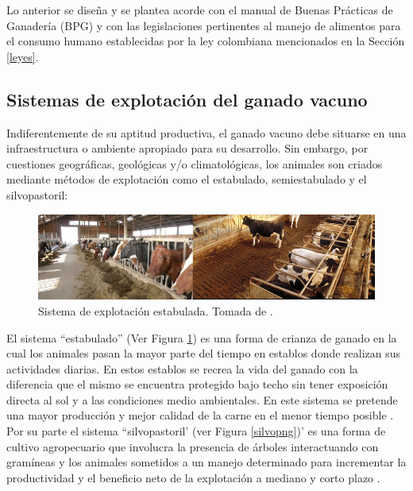 Lo anterior se diseña y se plantea acorde con el manual de Buenas Prácticas de Ganadería  (BPG) y con las legislaciones pertinentes al manejo de alimentos para el consumo humano establecidas por la ley colombiana mencionados en la Sección \ref{leyes}.


\subsection{Sistemas de explotación del ganado vacuno}

Indiferentemente de su aptitud productiva, el ganado vacuno debe situarse en una infraestructura o ambiente apropiado para su desarrollo. Sin embargo, por  cuestiones geográficas, geológicas y/o climatológicas, los animales son criados mediante métodos de explotación como el estabulado, semiestabulado y el silvopastoril:

\begin{figure}[H]
 \begin{center}
 \includegraphics[scale=0.8]{img/estabulado.png}
 \end{center}
 \caption{Sistema de explotación estabulada. Tomada de \cite{googlepics}. \label{estabulpng}}
\end{figure}

El sistema ``estabulado'' (Ver Figura \ref{estabulpng}) es una forma de crianza de ganado en la cual los animales pasan la mayor parte del tiempo en establos donde realizan sus actividades diarias. En estos establos se recrea la vida del ganado con la diferencia que el mismo se encuentra protegido bajo techo sin tener exposición directa al sol y a las condiciones medio ambientales. En este sistema se pretende una mayor producción y mejor calidad de la carne en el menor tiempo posible \cite{defestabulacion}. Por su parte el sistema ``silvopastoril' (ver Figura \ref{silvopng})' es una forma de cultivo agropecuario que involucra la presencia de árboles interactuando con gramíneas y los animales sometidos a un manejo determinado para incrementar la productividad y el beneficio neto de la explotación a mediano y corto plazo \cite{defsilvopas}.

